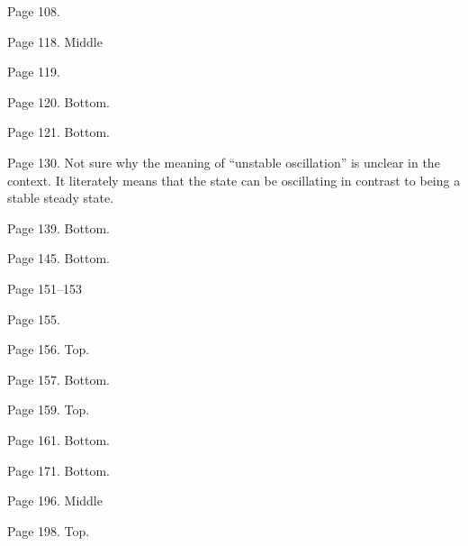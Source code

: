 \documentclass[11pt, fontset=Scala]{marticle}
\begin{document}
Page 108.

Page 118. Middle

Page 119.

Page 120. Bottom.

Page 121. Bottom.

Page 130. Not sure why the meaning of ``unstable oscillation'' is unclear in the context. It literately means that the state can be oscillating in contrast to being a stable steady state.

Page 139. Bottom.

Page 145. Bottom.

Page 151--153

Page 155.

Page 156. Top.

Page 157. Bottom.

Page 159. Top.

Page 161. Bottom.

Page 171. Bottom.

Page 196. Middle

Page 198. Top.

\end{document}
